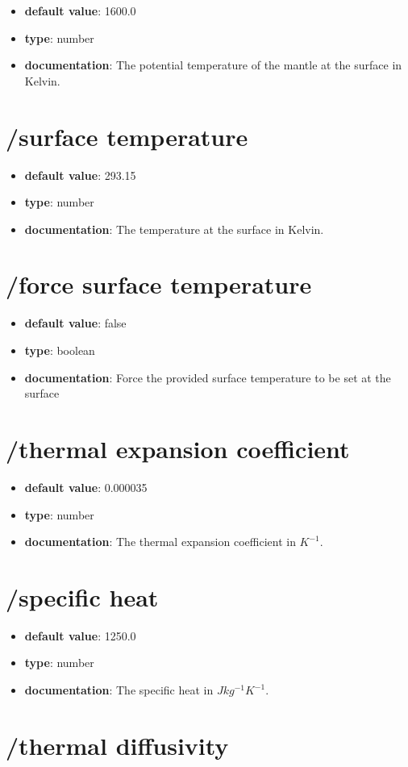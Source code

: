 \begin{itemize}\item {\bf default value}: 1600.0
\item {\bf type}: number
\item {\bf documentation}: The potential temperature of the mantle at the surface in Kelvin.
\end{itemize}\section{/surface temperature}
\begin{itemize}\item {\bf default value}: 293.15
\item {\bf type}: number
\item {\bf documentation}: The temperature at the surface in Kelvin.
\end{itemize}\section{/force surface temperature}
\begin{itemize}\item {\bf default value}: false
\item {\bf type}: boolean
\item {\bf documentation}: Force the provided surface temperature to be set at the surface
\end{itemize}\section{/thermal expansion coefficient}
\begin{itemize}\item {\bf default value}: 0.000035
\item {\bf type}: number
\item {\bf documentation}: The thermal expansion coefficient in $K^{-1}$.
\end{itemize}\section{/specific heat}
\begin{itemize}\item {\bf default value}: 1250.0
\item {\bf type}: number
\item {\bf documentation}: The specific heat in $J kg^{-1} K^{-1}.$
\end{itemize}\section{/thermal diffusivity}
